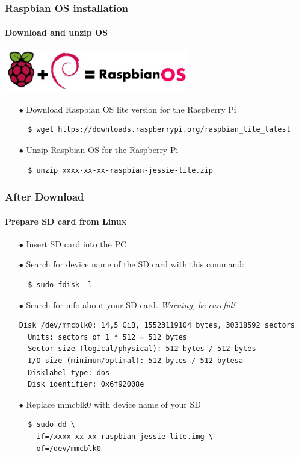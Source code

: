 \documentclass{beamer}
\begin{document}

\begin{frame}[fragile]
\frametitle{\textbf{Raspbian OS installation}}
\framesubtitle{\textbf{Download and unzip OS}}

\begin{center}
\includegraphics[width=0.60\textwidth]{imgs/raspbian_logo.jpg}
\end{center}
\begin{itemize}
\item[$\bullet$] Download Raspbian OS lite version for the Raspberry Pi
\begin{lstlisting}
  $ wget https://downloads.raspberrypi.org/raspbian_lite_latest
\end{lstlisting}
\item[$\bullet$] Unzip Raspbian OS for the Raspberry Pi
\begin{lstlisting}
  $ unzip xxxx-xx-xx-raspbian-jessie-lite.zip
\end{lstlisting}
\end{itemize}

\end{frame}


\begin{frame}[fragile]
\frametitle{\textbf{After Download}}
\framesubtitle{\textbf{Prepare SD card from Linux}}
\begin{itemize}
\item[$\bullet$] Insert SD card into the PC
\item[$\bullet$] Search for device name of the SD card with this command:
\begin{lstlisting}
  $ sudo fdisk -l
\end{lstlisting}
\item[$\bullet$] Search for info about your SD card. \textit{Warning, be careful!}
\begin{lstlisting}[basicstyle=\tiny\ttfamily]
  Disk /dev/mmcblk0: 14,5 GiB, 15523119104 bytes, 30318592 sectors      
  Units: sectors of 1 * 512 = 512 bytes                                 
  Sector size (logical/physical): 512 bytes / 512 bytes                 
  I/O size (minimum/optimal): 512 bytes / 512 bytesa                    
  Disklabel type: dos                                                   
  Disk identifier: 0x6f92008e                                           
\end{lstlisting}
\item[$\bullet$] Replace mmcblk0 with device name of your SD
\begin{lstlisting}
  $ sudo dd \
    if=/xxxx-xx-xx-raspbian-jessie-lite.img \
    of=/dev/mmcblk0
\end{lstlisting}
\end{itemize}

\end{frame}
\end{document}
